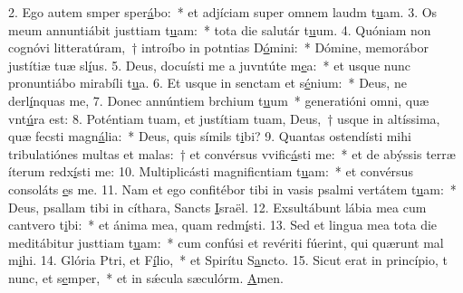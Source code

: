 2. Ego autem smper sper\uline{á}bo:~* et adjíciam super omnem laudm t\uline{u}am.
3. Os meum annuntiábit justtiam t\uline{u}am:~* tota die salutár t\uline{u}um.
4. Quóniam non cognóvi litteratúram,~† introíbo in potntias D\uline{ó}mini:~* Dómine, memorábor justítiæ tuæ sl\uline{í}us.
5. Deus, docuísti me a juvntúte m\uline{e}a:~* et usque nunc pronuntiábo mirabíli t\uline{u}a.
6. Et usque in senctam et s\uline{é}nium:~* Deus, ne derl\uline{í}nquas me,
7. Donec annúntiem brchium t\uline{u}um~* generatióni omni, quæ vnt\uline{ú}ra est:
8. Poténtiam tuam, et justítiam tuam, Deus,~† usque in altíssima, quæ fecsti magn\uline{á}lia:~* Deus, quis símils t\uline{i}bi?
9. Quantas ostendísti mihi tribulatiónes multas et malas:~† et convérsus vvific\uline{á}sti me:~* et de abýssis terræ íterum redx\uline{í}sti me:
10. Multiplicásti magnificntiam t\uline{u}am:~* et convérsus consoláts \uline{e}s me.
11. Nam et ego confitébor tibi in vasis psalmi vertátem t\uline{u}am:~* Deus, psallam tibi in cíthara, Sancts \uline{I}sraël.
12. Exsultábunt lábia mea cum cantvero t\uline{i}bi:~* et ánima mea, quam redm\uline{í}sti.
13. Sed et lingua mea tota die meditábitur justtiam t\uline{u}am:~* cum confúsi et revériti fúerint, qui quærunt mal m\uline{i}hi.
14. Glória Ptri, et F\uline{í}lio,~* et Spirítu S\uline{a}ncto.
15. Sicut erat in princípio, t nunc, et s\uline{e}mper,~* et in sǽcula sæculórm. \uline{A}men.
